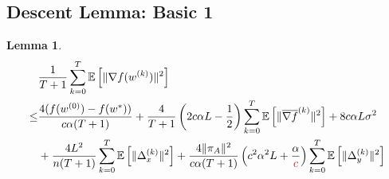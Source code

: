 \documentclass{article}
\newtheorem{lemma}[thm]{Lemma}
\newcommand{\EE}[1]{\mathbb{E}\left[#1\right]}
\newcommand{\norm}[1]{\| #1 \|}
\begin{document}
\subsection{Descent Lemma: Basic 1}
\begin{lemma}
  \begin{align*}
    &\frac{1}{T+1}\sum_{k=0}^T\EE{\norm{\nabla f(w^{(k)})}^2}\\ 
  \leq & \frac{4(f(w^{(0)})-f(w^{*}))}{c\alpha(T+1)}+\frac{4}{T+1}\left(2c\alpha L-\frac{1}{2}\right)\sum_{k=0}^T\EE{\norm{\overline{\nabla f}^{(k)}}^2}+8c\alpha L\sigma^2\\&+\frac{ 4L^2}{n(T+1)}\sum_{k=0}^T\EE{\norm{\Delta_x^{(k)}}^2}+\frac{4\norm{\pi_A}^2}{c\alpha(T+1)}\left(c^2\alpha^2L+\frac{\alpha}{\textcolor{red}{c}}\right)\sum_{k=0}^T\EE{\norm{\Delta_{y}^{(k)}}^2}
  \end{align*} 
\end{lemma}
\end{document}
